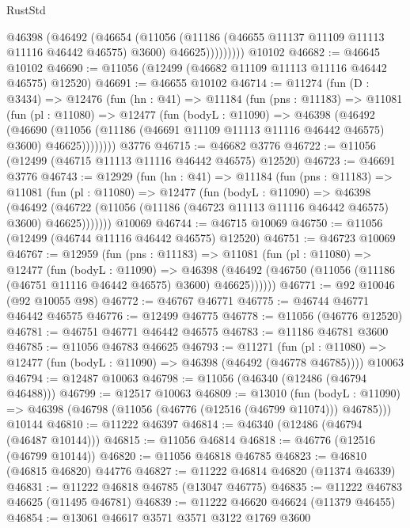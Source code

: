 \begin{lexlean}{RustStd}
\begin{coremodule}
              @46398
                (@46492
                  (@46654
                    (@11056
                      (@11186 (@46655 @11137 @11109 @11113 @11116 @46442 @46575) @3600)
                      @46625)))))))))
    @10102
@46682 := @46645 @10102
@46690 := @11056 (@12499 (@46682 @11109 @11113 @11116 @46442 @46575) @12520)
@46691 := @46655 @10102
@46714 := @11274
    (fun (D : @3434) =>
    @12476
      (fun (hn : @41) =>
      @11184
        (fun (pns : @11183) =>
        @11081
          (fun (pl : @11080) =>
          @12477
            (fun (bodyL : @11090) =>
            @46398
              (@46492
                (@46690
                  (@11056 (@11186 (@46691 @11109 @11113 @11116 @46442 @46575) @3600) @46625))))))))
    @3776
@46715 := @46682 @3776
@46722 := @11056 (@12499 (@46715 @11113 @11116 @46442 @46575) @12520)
@46723 := @46691 @3776
@46743 := @12929
    (fun (hn : @41) =>
    @11184
      (fun (pns : @11183) =>
      @11081
        (fun (pl : @11080) =>
        @12477
          (fun (bodyL : @11090) =>
          @46398
            (@46492
              (@46722 (@11056 (@11186 (@46723 @11113 @11116 @46442 @46575) @3600) @46625)))))))
    @10069
@46744 := @46715 @10069
@46750 := @11056 (@12499 (@46744 @11116 @46442 @46575) @12520)
@46751 := @46723 @10069
@46767 := @12959
    (fun (pns : @11183) =>
    @11081
      (fun (pl : @11080) =>
      @12477
        (fun (bodyL : @11090) =>
        @46398 (@46492 (@46750 (@11056 (@11186 (@46751 @11116 @46442 @46575) @3600) @46625))))))
@46771 := @92 @10046 (@92 @10055 @98)
@46772 := @46767 @46771
@46775 := @46744 @46771 @46442 @46575
@46776 := @12499 @46775
@46778 := @11056 (@46776 @12520)
@46781 := @46751 @46771 @46442 @46575
@46783 := @11186 @46781 @3600
@46785 := @11056 @46783 @46625
@46793 := @11271
    (fun (pl : @11080) => @12477 (fun (bodyL : @11090) => @46398 (@46492 (@46778 @46785))))
    @10063
@46794 := @12487 @10063
@46798 := @11056 (@46340 (@12486 (@46794 @46488)))
@46799 := @12517 @10063
@46809 := @13010
    (fun (bodyL : @11090) => @46398 (@46798 (@11056 (@46776 (@12516 (@46799 @11074))) @46785)))
    @10144
@46810 := @11222 @46397
@46814 := @46340 (@12486 (@46794 (@46487 @10144)))
@46815 := @11056 @46814
@46818 := @46776 (@12516 (@46799 @10144))
@46820 := @11056 @46818 @46785
@46823 := @46810 (@46815 @46820) @44776
@46827 := @11222 @46814 @46820 (@11374 @46339)
@46831 := @11222 @46818 @46785 (@13047 @46775)
@46835 := @11222 @46783 @46625 (@11495 @46781)
@46839 := @11222 @46620 @46624 (@11379 @46455)
@46854 := @13061
    @46617
    @3571
    @3571
    @3122
    @1769
    @3600

\end{coremodule}
\end{lexlean}
